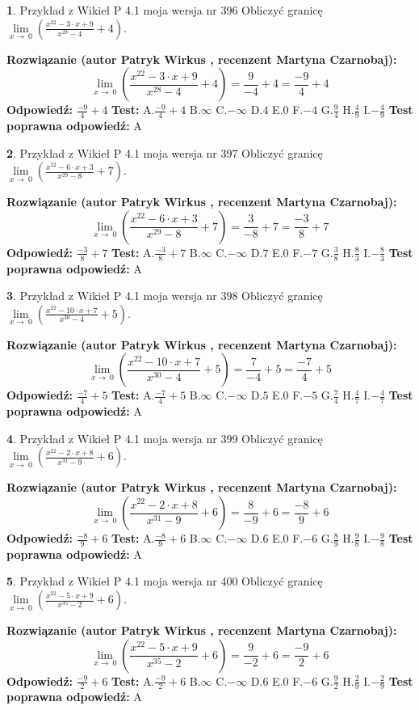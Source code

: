 \documentclass[12pt, a4paper]{article}
\theoremstyle{definition} %
\newtheorem{zad}{}
\newcommand{\zadStart}[1]{\begin{zad}#1\newline}
\newcommand{\zadStop}{\end{zad}}
\newcommand{\rozwStart}[2]{\noindent \textbf{Rozwiązanie (autor #1 , recenzent #2): }\newline}
\newcommand{\rozwStop}{\newline}
\newcommand{\odpStart}{\noindent \textbf{Odpowiedź:}\newline}
\newcommand{\odpStop}{\newline}
\newcommand{\testStart}{\noindent \textbf{Test:}\newline}
\newcommand{\testStop}{\newline}
\newcommand{\kluczStart}{\noindent \textbf{Test poprawna odpowiedź:}\newline}
\newcommand{\kluczStop}{\newline}
\begin{document}
\zadStart{Przykład z Wikieł P 4.1 moja wersja nr 396}
Obliczyć granicę $\lim\limits_{x\to\ 0}(\frac{x^{22}-3 \cdot x +9}{x^{28}-4}+4)$.
\zadStop
\rozwStart{Patryk Wirkus}{Martyna Czarnobaj}
$$\lim\limits_{x\to\ 0}(\frac{x^{22}-3 \cdot x +9}{x^{28}-4}+4)=\frac{9}{-4}+4=\frac{-9}{4}+4$$
\rozwStop
\odpStart
$\frac{-9}{4}+4$
\odpStop
\testStart
A.$\frac{-9}{4}+4$
B.$\infty$
C.$-\infty$
D.$4$
E.$0$
F.$-4$
G.$\frac{9}{4}$
H.$\frac{4}{9}$
I.$-\frac{4}{9}$
\testStop
\kluczStart
A
\kluczStop



\zadStart{Przykład z Wikieł P 4.1 moja wersja nr 397}
Obliczyć granicę $\lim\limits_{x\to\ 0}(\frac{x^{22}-6 \cdot x +3}{x^{29}-8}+7)$.
\zadStop
\rozwStart{Patryk Wirkus}{Martyna Czarnobaj}
$$\lim\limits_{x\to\ 0}(\frac{x^{22}-6 \cdot x +3}{x^{29}-8}+7)=\frac{3}{-8}+7=\frac{-3}{8}+7$$
\rozwStop
\odpStart
$\frac{-3}{8}+7$
\odpStop
\testStart
A.$\frac{-3}{8}+7$
B.$\infty$
C.$-\infty$
D.$7$
E.$0$
F.$-7$
G.$\frac{3}{8}$
H.$\frac{8}{3}$
I.$-\frac{8}{3}$
\testStop
\kluczStart
A
\kluczStop



\zadStart{Przykład z Wikieł P 4.1 moja wersja nr 398}
Obliczyć granicę $\lim\limits_{x\to\ 0}(\frac{x^{22}-10 \cdot x +7}{x^{30}-4}+5)$.
\zadStop
\rozwStart{Patryk Wirkus}{Martyna Czarnobaj}
$$\lim\limits_{x\to\ 0}(\frac{x^{22}-10 \cdot x +7}{x^{30}-4}+5)=\frac{7}{-4}+5=\frac{-7}{4}+5$$
\rozwStop
\odpStart
$\frac{-7}{4}+5$
\odpStop
\testStart
A.$\frac{-7}{4}+5$
B.$\infty$
C.$-\infty$
D.$5$
E.$0$
F.$-5$
G.$\frac{7}{4}$
H.$\frac{4}{7}$
I.$-\frac{4}{7}$
\testStop
\kluczStart
A
\kluczStop



\zadStart{Przykład z Wikieł P 4.1 moja wersja nr 399}
Obliczyć granicę $\lim\limits_{x\to\ 0}(\frac{x^{22}-2 \cdot x +8}{x^{31}-9}+6)$.
\zadStop
\rozwStart{Patryk Wirkus}{Martyna Czarnobaj}
$$\lim\limits_{x\to\ 0}(\frac{x^{22}-2 \cdot x +8}{x^{31}-9}+6)=\frac{8}{-9}+6=\frac{-8}{9}+6$$
\rozwStop
\odpStart
$\frac{-8}{9}+6$
\odpStop
\testStart
A.$\frac{-8}{9}+6$
B.$\infty$
C.$-\infty$
D.$6$
E.$0$
F.$-6$
G.$\frac{8}{9}$
H.$\frac{9}{8}$
I.$-\frac{9}{8}$
\testStop
\kluczStart
A
\kluczStop



\zadStart{Przykład z Wikieł P 4.1 moja wersja nr 400}
Obliczyć granicę $\lim\limits_{x\to\ 0}(\frac{x^{22}-5 \cdot x +9}{x^{35}-2}+6)$.
\zadStop
\rozwStart{Patryk Wirkus}{Martyna Czarnobaj}
$$\lim\limits_{x\to\ 0}(\frac{x^{22}-5 \cdot x +9}{x^{35}-2}+6)=\frac{9}{-2}+6=\frac{-9}{2}+6$$
\rozwStop
\odpStart
$\frac{-9}{2}+6$
\odpStop
\testStart
A.$\frac{-9}{2}+6$
B.$\infty$
C.$-\infty$
D.$6$
E.$0$
F.$-6$
G.$\frac{9}{2}$
H.$\frac{2}{9}$
I.$-\frac{2}{9}$
\testStop
\kluczStart
A
\kluczStop
\end{document}
